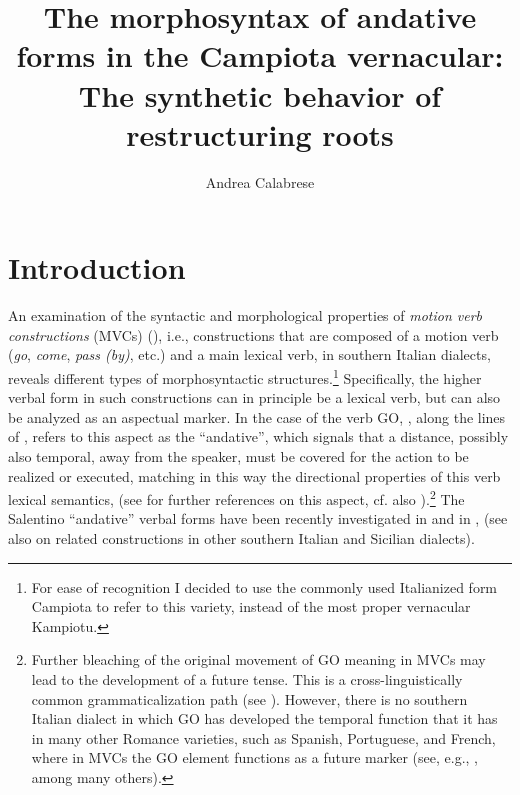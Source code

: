 \documentclass[output=paper]{langscibook}
\author{Andrea Calabrese\affiliation{University of Connecticut}}
\title[The morphosyntax of andative forms in the Campiota vernacular]
      {The morphosyntax of andative forms in the Campiota vernacular: The synthetic behavior of restructuring roots}
\begin{document}
\maketitle

\section{Introduction}


An examination of the syntactic and morphological properties of \textit{motion verb constructions} (MVCs) (\citealt{cruschina2013a, cruschina2021a}), i.e., constructions that are composed of a motion verb (\textit{go}, \textit{come}, \textit{pass (by)}, etc.) and a main lexical verb, in southern Italian dialects, reveals different types of morphosyntactic structures.\footnote{For ease of recognition I decided to use the commonly used Italianized form Campiota to refer to this variety, instead of the most proper vernacular Kampiotu.} Specifically, the higher verbal form in such constructions can in principle be a lexical verb, but can also be analyzed as an aspectual marker. In the case of the verb GO, \citet{cruschina2013a}, along the lines of \citet{Cinque1999, Cinque2006}, refers to this aspect as the “andative”, which signals that a distance, possibly also temporal, away from the speaker, must be covered for the action to be realized or executed, matching in this way the directional properties of this verb lexical semantics, (see \citet{cinque2006a} for further references on this aspect, cf. also \citet{heine2018a}).\footnote{Further bleaching of the original movement of GO meaning in MVCs  may lead to the development of a future tense. This is a cross-linguistically common grammaticalization path (see \citealt{bybee1994a}). However, there is no southern Italian dialect in which GO has developed the temporal function that it has in many other Romance varieties, such as Spanish, Portuguese, and French, where in MVCs the GO element functions as a future marker (see, e.g., \citealt{squartini1998a}, among many others).}   The Salentino “andative” verbal forms have been recently investigated in \citet{ledgeway2016a} and in \citet{manzini2017a}, \citet{cardinaletti2019a} (see also \citealt{andriani2017a, cardinaletti2001a, cardinaletti2003a, cruschina2013a, cruschina2021a, caro2015a, caro2018a, caro2019a, caro2015b, manzini2005a} on related constructions in other southern Italian and Sicilian dialects).
\end{document}
